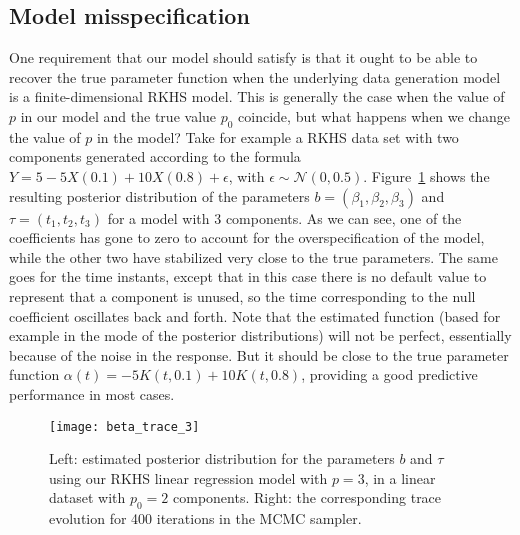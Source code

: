 \subsection{Model misspecification}

One requirement that our model should satisfy is that it ought to be able to recover the true parameter function when the underlying data generation model is a finite-dimensional RKHS model. This is generally the case when the value of \(p\) in our model and the true value \(p_0\) coincide, but what happens when we change the value of \(p\) in the model? Take for example a RKHS data set with two components generated according to the formula \(Y=5 -5X(0.1) + 10X(0.8) + \epsilon\), with \(\epsilon\sim \mathcal N(0, 0.5)\). Figure~\ref{fig:beta_trace_3} shows the resulting posterior distribution of the parameters \(b=(\beta_1, \beta_2, \beta_3)\) and \(\tau=(t_1, t_2, t_3)\) for a model with 3 components. As we can see, one of the coefficients has gone to zero to account for the overspecification of the model, while the other two have stabilized very close to the true parameters. The same goes for the time instants, except that in this case there is no default value to represent that a component is unused, so the time corresponding to the null coefficient oscillates back and forth. Note that the estimated function (based for example in the mode of the posterior distributions) will not be perfect, essentially because of the noise in the response. But it should be close to the true parameter function \(\alpha(t)=-5K(t, 0.1) + 10K(t, 0.8)\), providing a good predictive performance in most cases.

\begin{figure}[ht!]
    \centering
    \texttt{[image: beta\_trace\_3]}
    \caption{Left: estimated posterior distribution for the parameters \(b\) and \(\tau\) using our RKHS linear regression model with \(p=3\), in a linear dataset with \(p_0=2\) components. Right: the corresponding trace evolution for 400 iterations in the MCMC sampler.}\label{fig:beta_trace_3}
\end{figure}

